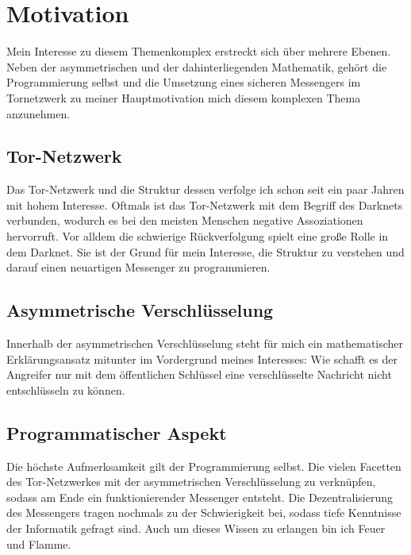 \documentclass[a4paper,ngerman, headheight=28pt,11pt]{scrartcl}
\begin{document}

\tableofcontents
\setcounter{page}{0}

\vspace{0.5cm}
\pagebreak

\linenumbers
\modulolinenumbers[5]

\section{Motivation}
Mein Interesse zu diesem Themenkomplex erstreckt sich über mehrere Ebenen. Neben der asymmetrischen und der dahinterliegenden Mathematik, gehört die Programmierung selbst und die Umsetzung eines sicheren Messengers im Tornetzwerk zu meiner Hauptmotivation mich diesem komplexen Thema anzunehmen.
\subsection{Tor-Netzwerk}
Das Tor-Netzwerk und die Struktur dessen verfolge ich schon seit ein paar Jahren mit hohem Interesse. Oftmals ist das Tor-Netzwerk mit dem Begriff des Darknets verbunden, wodurch es bei den meisten Menschen negative Assoziationen hervorruft. Vor alldem die schwierige Rückverfolgung spielt eine große Rolle in dem Darknet. Sie ist der Grund für mein Interesse, die Struktur zu verstehen und darauf einen neuartigen Messenger zu programmieren.

\subsection{Asymmetrische Verschlüsselung}
Innerhalb der asymmetrischen Verschlüsselung steht für mich ein mathematischer Erklärungsansatz mitunter im Vordergrund meines Interesses: \glqq Wie schafft es der Angreifer nur mit dem öffentlichen Schlüssel eine verschlüsselte Nachricht nicht entschlüsseln zu können\grqq.

\subsection{Programmatischer Aspekt}
Die höchste Aufmerksamkeit gilt der Programmierung selbst. Die vielen Facetten des Tor-Netzwerkes mit der asymmetrischen Verschlüsselung zu verknüpfen, sodass am Ende ein funktionierender Messenger entsteht. Die Dezentralisierung des Messengers tragen nochmals zu der Schwierigkeit bei, sodass tiefe Kenntnisse der Informatik gefragt sind. Auch um dieses Wissen zu erlangen bin ich Feuer und Flamme.
\end{document}
